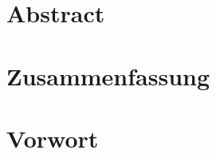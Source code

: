 \pagestyle{empty}

\section*{Abstract}


\newpage
\section*{Zusammenfassung}


\newpage
\section*{Vorwort}

